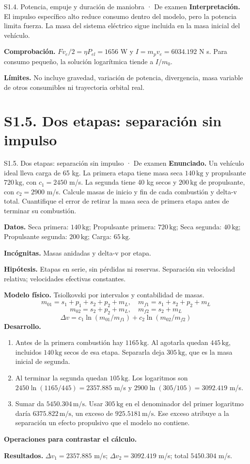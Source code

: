 \begin{studiumworked}{S1.4. Potencia, empuje y duración de maniobra · De examen}
\textbf{Interpretación.} El impulso específico alto reduce consumo dentro del modelo, pero la potencia limita fuerza. La masa del sistema eléctrico sigue incluida en la masa inicial del vehículo.

\textbf{Comprobación.} $Fv_e/2=\eta P_{el}=1656$ W y $I=m_pv_e=6034.192$ N s. Para consumo pequeño, la solución logarítmica tiende a $I/m_0$.

\textbf{Límites.} No incluye gravedad, variación de potencia, divergencia, masa variable de otros consumibles ni trayectoria orbital real.
\end{studiumworked}
\section{S1.5. Dos etapas: separación sin impulso}
\begin{studiumworked}{S1.5. Dos etapas: separación sin impulso · De examen}
\textbf{Enunciado.} Un vehículo ideal lleva carga de 65 kg. La primera etapa tiene masa seca $140\,\mathrm{kg}$ y propulsante $720\,\mathrm{kg}$, con $c_1=2450$ m/s. La segunda tiene 40 kg secos y $200\,\mathrm{kg}$ de propulsante, con $c_2=2900$ m/s. Calcule masas de inicio y fin de cada combustión y delta-v total. Cuantifique el error de retirar la masa seca de primera etapa antes de terminar su combustión.

\textbf{Datos.} Seca primera: $140\,\mathrm{kg}$; Propulsante primera: $720\,\mathrm{kg}$; Seca segunda: $40\,\mathrm{kg}$; Propulsante segunda: $200\,\mathrm{kg}$; Carga: $65\,\mathrm{kg}$.

\textbf{Incógnitas.} Masas anidadas y delta-v por etapa.

\textbf{Hipótesis.} Etapas en serie, sin pérdidas ni reservas. Separación sin velocidad relativa; velocidades efectivas constantes.

\textbf{Modelo físico.} Tsiolkovski por intervalos y contabilidad de masas.
\[m_{01}=s_1+p_1+s_2+p_2+m_L,\quad m_{f1}=s_1+s_2+p_2+m_L\]
\[m_{02}=s_2+p_2+m_L,\quad m_{f2}=s_2+m_L\]
\[\Delta v=c_1\ln(m_{01}/m_{f1})+c_2\ln(m_{02}/m_{f2})\]
\textbf{Desarrollo.}
\begin{enumerate}
\item Antes de la primera combustión hay $1165\,\mathrm{kg}$. Al agotarla quedan $445\,\mathrm{kg}$, incluidos $140\,\mathrm{kg}$ secos de esa etapa. Separarla deja $305\,\mathrm{kg}$, que es la masa inicial de segunda.
\item Al terminar la segunda quedan $105\,\mathrm{kg}$. Los logaritmos son $2450\ln(1165/445)=2357.885$ m/s y $2900\ln(305/105)=3092.419$ m/s.
\item Sumar da $5450.304\,\mathrm{m/s}$. Usar $305\,\mathrm{kg}$ en el denominador del primer logaritmo daría $6375.822\,\mathrm{m/s}$, un exceso de $925.5181\,\mathrm{m/s}$. Ese exceso atribuye a la separación un efecto propulsivo que el modelo no contiene.
\end{enumerate}
\textbf{Operaciones para contrastar el cálculo.}

\textbf{Resultados.} $\Delta v_1=2357.885$ m/s; $\Delta v_2=3092.419$ m/s; total $5450.304$ m/s.


\end{studiumworked}
